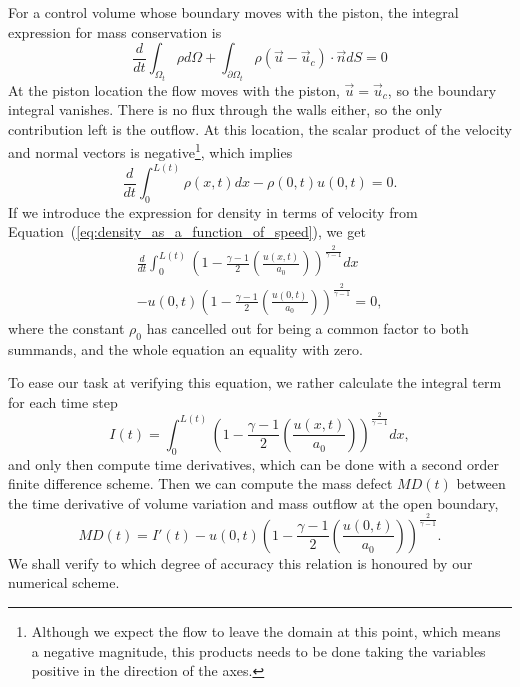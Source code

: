 \documentclass[../../thesis.tex]{subfiles}
\begin{document}
For a control volume whose boundary moves with the piston, 
the integral expression for mass conservation is
\begin{equation}
    \frac{d}{dt}\int_{\Omega_t} \rho d\Omega 
    + \int_{\partial\Omega_t} \rho \left(\vec{u} - \vec{u}_c\right) \cdot \vec{n} dS = 0
\end{equation}
At the piston location the flow moves with the piston, $\vec{u} = \vec{u}_c$, 
so the boundary integral vanishes. 
There is no flux through the walls either, so the only contribution left is the outflow.
At this location, the scalar product of the velocity and normal vectors is 
negative\footnote{Although we expect the flow to leave the domain at this point, 
which means a negative magnitude, this products needs to be done taking 
the variables positive in the direction of the axes.}, which implies
\begin{equation}
    \frac{d}{dt}\int_{0}^{L(t)} \rho(x,t) dx - \rho(0,t) u(0,t) = 0.
    \label{eq:integral_mass_conservation}
\end{equation}
If we introduce the expression for density in terms of velocity from 
Equation~(\ref{eq:density_as_a_function_of_speed}), we get
\begin{equation}
\begin{split}
        \frac{d}{dt}\int_{0}^{L(t)} \left(1 - \frac{\gamma-1}{2}\left(\frac{u(x,t)}{a_0}\right)\right)^{\frac{2}{\gamma-1}} dx 
        \\
        - u(0,t) \left(1 - \frac{\gamma-1}{2}\left(\frac{u(0,t)}{a_0}\right)\right)^{\frac{2}{\gamma-1}}  = 0,
\end{split}
\end{equation}
where the constant $\rho_0$ has cancelled out for being a common factor to both summands,
and the whole equation an equality with zero.

To ease our task at verifying this equation, we rather calculate the integral term for each time step
\begin{equation}
    I(t) = \int_{0}^{L(t)} \left(1 - \frac{\gamma-1}{2}\left(\frac{u(x,t)}{a_0}\right)\right)^{\frac{2}{\gamma-1}} dx,
\end{equation}
and only then compute time derivatives, which can be done with a second order finite difference scheme.
Then we can compute the mass defect $MD(t)$ between the time derivative of volume variation
and mass outflow at the open boundary,
\begin{equation}
    MD(t) = I'(t) - u(0,t) \left(1 - \frac{\gamma-1}{2}\left(\frac{u(0,t)}{a_0}\right)\right)^{\frac{2}{\gamma-1}}.
    \label{eq:mass_conservation_check}
\end{equation}
We shall verify to which degree of accuracy this relation is honoured by our numerical scheme.
\end{document}
